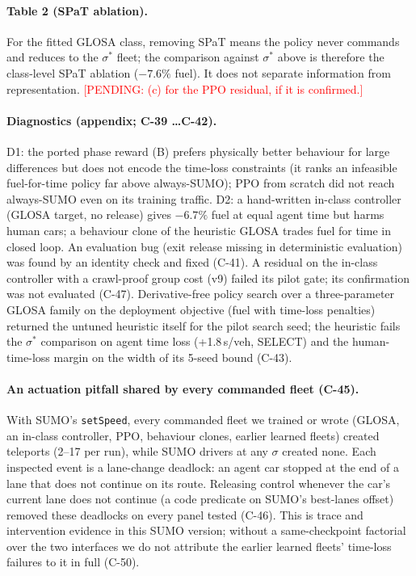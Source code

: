 \documentclass[11pt]{article}
\newcommand{\pending}[1]{\textcolor{red}{[PENDING: #1]}}
\begin{document}
\paragraph{Table 2 (SPaT ablation).} For the fitted GLOSA class, removing SPaT means the policy never commands and reduces to the
$\sigma^*$ fleet; the comparison against $\sigma^*$ above is therefore the class-level SPaT ablation ($-7.6\%$ fuel). It does not separate
information from representation. \pending{(c) for the PPO residual, if it is confirmed.}
\paragraph{Diagnostics (appendix; C-39 \dots C-42).} D1: the ported phase reward (B) prefers physically better behaviour for large
differences but does not encode the time-loss constraints (it ranks an infeasible fuel-for-time policy far above always-SUMO); PPO from
scratch did not reach always-SUMO even on its training traffic. D2: a hand-written in-class controller (GLOSA target, no release) gives
$-6.7\%$ fuel at equal agent time but harms human cars; a behaviour clone of the heuristic GLOSA trades fuel for time in closed loop.
An evaluation bug (exit release missing in deterministic evaluation) was found by an identity check and fixed (C-41).
A residual on the in-class controller with a crawl-proof group cost (v9) failed its pilot gate; its confirmation was not evaluated (C-47).
Derivative-free policy search over a three-parameter GLOSA family on the deployment objective (fuel with time-loss penalties) returned
the untuned heuristic itself for the pilot search seed; the heuristic fails the $\sigma^*$ comparison on agent time loss (+1.8\,s/veh,
SELECT) and the human-time-loss margin on the width of its 5-seed bound (C-43).
\paragraph{An actuation pitfall shared by every commanded fleet (C-45).} With SUMO's \texttt{setSpeed}, every commanded fleet we
trained or wrote (GLOSA, an in-class controller, PPO, behaviour clones, earlier learned fleets) created teleports (2--17 per run), while
SUMO drivers at any $\sigma$ created none. Each inspected event is a lane-change deadlock: an agent car stopped at the end of a lane that does
not continue on its route. Releasing control whenever the car's current lane does not continue (a code predicate on SUMO's best-lanes
offset) removed these deadlocks on every panel tested (C-46). This is trace and intervention evidence in this SUMO version; without a
same-checkpoint factorial over the two interfaces we do not attribute the earlier learned fleets' time-loss failures to it in full (C-50).
\end{document}
